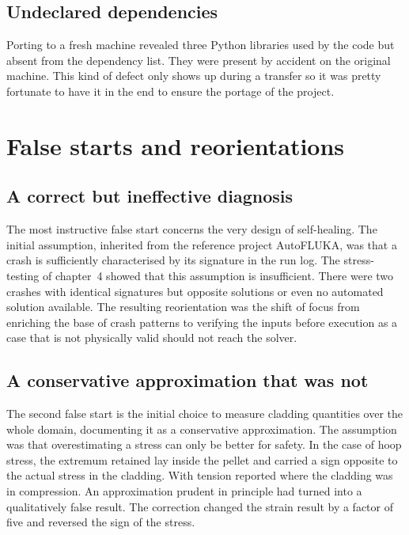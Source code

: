 \documentclass[12pt,a4paper]{report}
\begin{document}
\subsection{Undeclared dependencies}

Porting to a fresh machine revealed three Python libraries used by the code but
absent from the dependency list. They were present by accident on the original
machine. This kind of defect only shows up during a transfer so it was pretty fortunate to have it in the end to ensure the portage of the project.

\section{False starts and reorientations}

\subsection{A correct but ineffective diagnosis}

The most instructive false start concerns the very design of self-healing. The
initial assumption, inherited from the reference project AutoFLUKA, was that a crash is
sufficiently characterised by its signature in the run log. The stress-testing
of chapter~4 showed that this assumption is insufficient. There were two crashes with
identical signatures but opposite solutions or even no automated solution available.
The resulting reorientation was the shift of focus from enriching the base of crash patterns to verifying the inputs
before execution as a case that is not physically valid should not reach the solver.

\subsection{A conservative approximation that was not}

The second false start is the initial choice to measure cladding quantities over
the whole domain, documenting it as a conservative approximation. The assumption was that overestimating a stress can only be better for safety.
In the case of hoop stress, the extremum retained lay inside the
pellet and carried a sign opposite to the actual stress in the cladding. With tension reported where the cladding was in compression. An approximation
prudent in principle had turned into a qualitatively false result.
The correction changed the strain result by a factor of five and reversed the sign
of the stress. 
\end{document}
